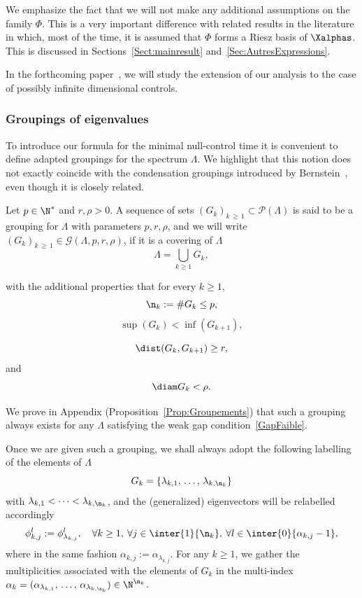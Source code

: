 We emphasize the fact that we will not make any additional assumptions on the family $\Phi$. This is a very important difference with related results in the literature in which, most of the time, it is assumed that $\Phi$ forms a Riesz basis of $\Xalphas$. This is discussed in Sections~\ref{Sect:mainresult} and~\ref{Sec:AutresExpressions}.


In the forthcoming paper~\cite{BoyerMorancey}, we will study the extension of our analysis to the case of possibly infinite dimensional controls.


\subsubsection{Groupings of eigenvalues} \label{Sec:Groupings}
To introduce our formula for the minimal null-control time it is convenient to define adapted groupings for the spectrum $\Lambda$. We highlight that this notion does not exactly coincide with the condensation groupings introduced by Bernstein~\cite{Bernstein33}, even though it is closely related.
\begin{defi} \label{Def:Groupements}
Let $p \in \N^*$ and $r,\rho >0$. A sequence of sets $(G_k)_{k\,\geq\,1} \subset \mathcal{P}(\Lambda)$ is said to be a grouping for $\Lambda$ with parameters $p, r, \rho$, and we will write $(G_k)_{k\,\geq \,1} \in \mathcal{G}(\Lambda,p,r,\rho)$, if it is a covering of $\Lambda$
\[
\Lambda = \bigcup\limits_{k \geq 1} G_k,
\]
\goodbreak

with the additional properties that for every $k \geq 1$,
\[
\n_k := \# G_k \leq p,
\]
\[
\sup(G_k) < \inf(G_{k+1}),
\]

\begin{equation}\label{ConstructionGroupement_distance}
\dist (G_k, G_{k+1}) \geq r,
\end{equation}
and
\begin{equation}\label{ConstructionGroupement_diametre}
\diam G_k < \rho.
\end{equation}
\end{defi}

We prove in Appendix (Proposition~\ref{Prop:Groupements}) that such a grouping always exists for any $\Lambda$ satisfying the weak gap condition~\eqref{GapFaible}.

Once we are given such a grouping, we shall always adopt the following labelling of the elements of $\Lambda$
\[
G_k = \left\{ \lambda_{k,1},\,\dots,\, \lambda_{k,\n_k} \right\}
\]
with $\lambda_{k,1} < \dots < \lambda_{k,\n_k}$, and the (generalized) eigenvectors will be relabelled accordingly
\[
\phi_{k,j}^l := \phi_{\lambda_{k,j}}^l, \quad \forall k\geq 1, \: \forall j\in \inter{1}{\n_k}, \: \forall l \in \inter{0}{\alpha_{k,j}-1},
\]
where in the same fashion $\alpha_{k,j} := \alpha_{\lambda_{k,j}}$. For any $k \geq 1$, we gather the multiplicities associated with the elements of $G_k$ in the multi-index $\alpha_k=(\alpha_{\lambda_{k,1}},\,\dotsc,\, \alpha_{\lambda_{k,\n_k}})\in \N^{\n_k}$.

